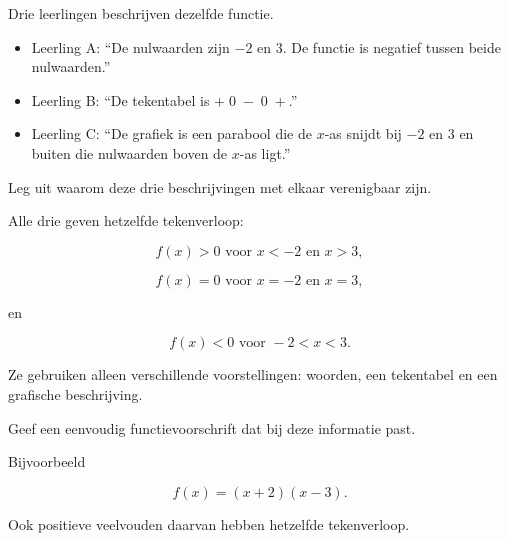 \documentclass{ximera}
\begin{document}
\begin{oefening}{\oefU\ESS}

Drie leerlingen beschrijven dezelfde functie.

\begin{itemize}
    \item Leerling A: ``De nulwaarden zijn \(-2\) en \(3\). De functie
          is negatief tussen beide nulwaarden.''
    \item Leerling B: ``De tekentabel is \(+\;0\;-\;0\;+\).''
    \item Leerling C: ``De grafiek is een parabool die de \(x\)-as
          snijdt bij \(-2\) en \(3\) en buiten die nulwaarden boven
          de \(x\)-as ligt.''
\end{itemize}

\begin{question}
Leg uit waarom deze drie beschrijvingen met elkaar verenigbaar zijn.

\begin{oplossing}
Alle drie geven hetzelfde tekenverloop:

\[
f(x)>0 \text{ voor }x<-2\text{ en }x>3,
\]

\[
f(x)=0 \text{ voor }x=-2\text{ en }x=3,
\]

en

\[
f(x)<0 \text{ voor }-2<x<3.
\]

Ze gebruiken alleen verschillende voorstellingen:
woorden, een tekentabel en een grafische beschrijving.
\end{oplossing}
\end{question}

\begin{question}
Geef een eenvoudig functievoorschrift dat bij deze informatie past.

\begin{oplossing}
Bijvoorbeeld

\[
f(x)=(x+2)(x-3).
\]

Ook positieve veelvouden daarvan hebben hetzelfde tekenverloop.
\end{oplossing}
\end{question}

\end{oefening}
\end{document}
